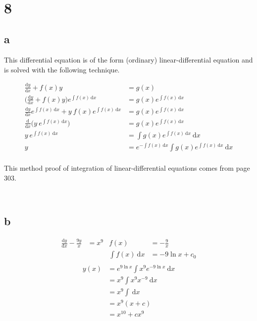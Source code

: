 \documentclass{article}
\newcommand{\md}{~\mathrm d}
\newcommand{\Md}{\mathrm d}
\newcommand{\blankpage}{
    \newpage
    \
    \newpage
}
\begin{document}
\blankpage
\section{8}
\subsection{a}

This differential equation is of the form (ordinary) linear-differential equation and is solved with the following technique.

\begin{align*}
    \frac{\Md y}{\Md x} + f(x)y
        &= g(x) \\
    \Big(\frac{\Md y}{\Md x} + f(x) y\Big) e^{\int f(x) \md x}
        &= g(x) e^{\int f(x) \md x} \\
    \frac{\Md y}{\Md x} e^{\int f(x) \md x} + y ~ f(x) e^{\int f(x) \md x}
        &= g(x) e^{\int f(x) \md x} \\
    \frac{\Md}{\Md x} \big(y ~ e^{\int f(x) \md x}\big)
        &= g(x) e^{\int f(x) \md x} \\
    y ~ e^{\int f(x) \md x}
        &= \int g(x) e^{\int f(x) \md x} \md x \\
    y &= e^{-\int f(x) \md x}
        \int g(x) e^{\int f(x) \md x} \md x \\
\end{align*}

This method proof of integration of linear-differential equations comes from \cite{maths:r2} page 303.

\blankpage
\subsection{b}

\begin{align*}
    \frac{\Md y}{\Md x} - \frac{9 y}x &= x^9 &
        f(x) &= -\frac9x \\
    && \int f(x) \md x &= -9 \ln x + c_0\\
\end{align*}
\begin{align*}
    y(x) &= e^{9 \ln x}\int x^9 e^{-9 \ln x} \md x \\
         &= x^9\int x^9x^{-9} \md x \\
         &= x^9\int \md x \\
         &= x^9(x + c) \\
         &= x^{10} + cx^9 \\
\end{align*}
\end{document}
